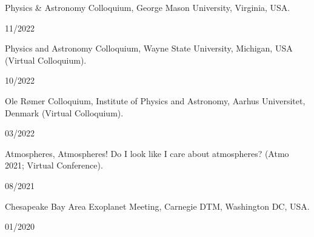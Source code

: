 \documentclass[12pt, a4paper]{article} %
\begin{document}
\begin{minipage}[t]{0.7\textwidth}
\begin{flushleft}%
  \setlength{\leftskip}{0.2cm}%
Physics \& Astronomy Colloquium, George Mason University, Virginia, USA.
\end{flushleft}
\end{minipage}
\begin{minipage}[t]{0.3\textwidth}
\hfill 11/2022
\end{minipage}
\vspace{0.2cm}

\begin{minipage}[t]{0.7\textwidth}
\begin{flushleft}%
  \setlength{\leftskip}{0.2cm}%
Physics and Astronomy Colloquium, Wayne State University, Michigan, USA (Virtual Colloquium).
\end{flushleft}
\end{minipage}
\begin{minipage}[t]{0.3\textwidth}
\hfill 10/2022
\end{minipage}
\vspace{0.2cm}

\begin{minipage}[t]{0.7\textwidth}
\begin{flushleft}%
  \setlength{\leftskip}{0.2cm}%
Ole Rømer Colloquium, Institute of Physics and Astronomy, Aarhus Universitet, Denmark (Virtual Colloquium).
\end{flushleft}
\end{minipage}
\begin{minipage}[t]{0.3\textwidth}
\hfill 03/2022
\end{minipage}
\vspace{0.2cm}

\begin{minipage}[t]{0.7\textwidth}
\begin{flushleft}%
  \setlength{\leftskip}{0.2cm}%
Atmospheres, Atmospheres! Do I look like I care about atmospheres? (Atmo 2021; Virtual Conference).
\end{flushleft}
\end{minipage}
\begin{minipage}[t]{0.3\textwidth}
\hfill 08/2021
\end{minipage}
\vspace{0.2cm}

\begin{minipage}[t]{0.7\textwidth}
\begin{flushleft}%
  \setlength{\leftskip}{0.2cm}%
Chesapeake Bay Area Exoplanet Meeting, Carnegie DTM, Washington DC, USA.
\end{flushleft}
\end{minipage}
\begin{minipage}[t]{0.3\textwidth}
\hfill 01/2020
\end{minipage}
\vspace{0.2cm}
\end{document}
